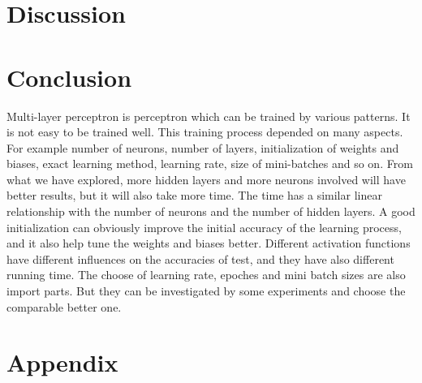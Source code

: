\documentclass[12pt,a4paper]{article}
\begin{document}
\section{Discussion}


\section{Conclusion}
Multi-layer perceptron is perceptron which can be trained by various patterns. It is not easy to be trained well. This training process depended on many aspects. For example number of neurons, number of layers, initialization of weights and biases, exact learning method, learning rate, size of mini-batches and so on. 
From what we have explored, more hidden layers and more neurons involved will have better results, but it will also take more time. The time has a similar linear relationship with the number of neurons and the number of hidden layers. A good initialization can obviously improve the initial accuracy of the learning process, and it also help tune the weights and biases better. Different activation functions have different influences on the accuracies of test, and they have also different running time. The choose of learning rate, epoches and mini batch sizes are also import parts. But they can be investigated by some experiments and choose the comparable better one.

\newpage
\section{Appendix}
\end{document}
